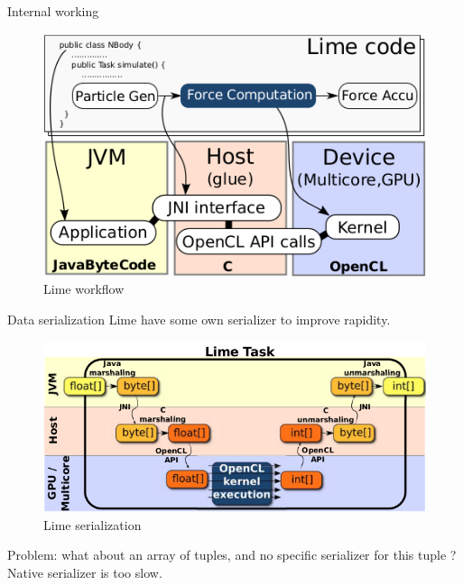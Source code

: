 \documentclass[10pt, compress]{beamer}
\begin{document}

\begin{frame}{Internal working}
    \begin{figure}
    \centering
    \includegraphics[scale=0.55]{images/lime_internal.png}
    \caption{Lime workflow}
    \label{img:lime_workflow}
    \end{figure}
\end{frame}


\begin{frame}{Data serialization}
    Lime have some own serializer to improve rapidity.
    \begin{figure}
    \centering
    \includegraphics[scale=0.45]{images/lime_serialization.png}
    \caption{Lime serialization}
    \label{img:lime_serialization}
    \end{figure}
    \alert{Problem:} what about an array of tuples, and no specific serializer for this tuple ? Native serializer is too slow.
\end{frame}
\end{document}
